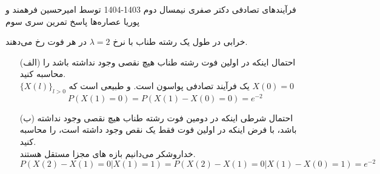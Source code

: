 \documentclass[11pt, a4, twoside]{article}
\begin{document}
	\pagestyle{empty}
	\heading
	{فرآیندهای تصادفی}
	{دکتر صفری}
	{نیمسال دوم 1403-1404}
    {توسط امیرحسین فرهمند و پوریا عصاره‌ها}
    {پاسخ تمرین سری سوم}

\begin{problem}
    خرابی در طول یک رشته طناب با نرخ $\lambda = 2$ در هر فوت رخ می‌دهند.

    \begin{itemize}
    \item[(الف)] احتمال اینکه در اولین فوت رشته طناب هیچ نقصی وجود نداشته باشد را محاسبه کنید.
    {\\ \color{blue}
    \(\{X(l)\}_{l>0}\) یک فرآیند تصادفی پواسون است. و طبیعی است که \(X(0) = 0\)
    \[P(X(1) = 0) = P(X(1) - X(0) = 0) = e^{-2}\]
    }
    \item[(ب)] احتمال شرطی اینکه در دومین فوت رشته طناب هیچ نقصی وجود نداشته باشد، با فرض اینکه در اولین فوت فقط یک نقص وجود داشته است، را محاسبه کنید.
    {\\ \color{blue}
    خداروشکر می‌دانیم بازه های مجزا مستقل هستند.
    \[P(X(2) - X(1) = 0 | X(1) = 1) = P(X(2) - X(1) = 0 | X(1) - X(0) = 1) = e^{-2}\]
    }
    \end{itemize}

\end{problem}
\end{document}
